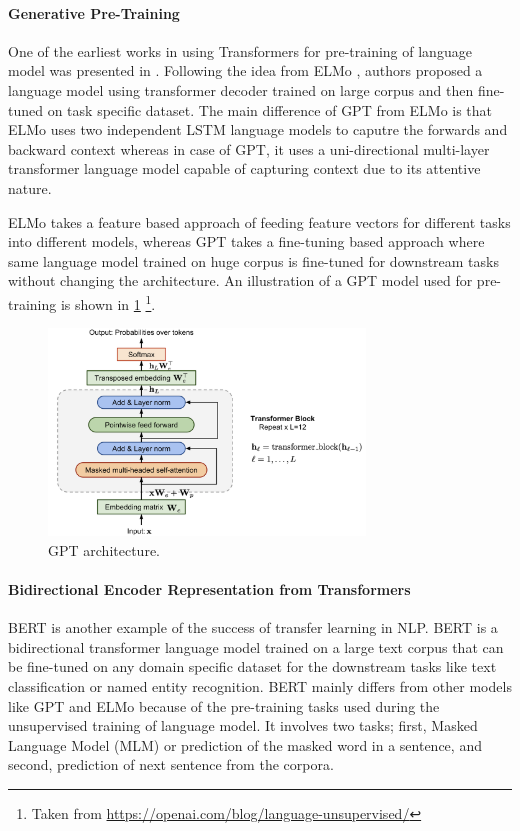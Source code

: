 \paragraph{Generative Pre-Training}
One of the earliest works in using Transformers for pre-training of language model was presented in \cite{radford2018improving}. Following the idea from ELMo \cite{peters2018deep}, authors proposed a language model using transformer decoder trained on large corpus and then fine-tuned on task specific dataset. The main difference of GPT from ELMo is that ELMo uses two independent LSTM language models to caputre the forwards and backward context whereas in case of GPT, it uses a uni-directional multi-layer transformer language model capable of capturing context due to its attentive nature.

ELMo takes a feature based approach of feeding feature vectors for different tasks into different models, whereas GPT takes a fine-tuning based approach where same language model trained on huge corpus is fine-tuned for downstream tasks without changing the architecture. An illustration of a GPT model used for pre-training is shown in \cref{fig:gpt} \footnote{Taken from \url{https://openai.com/blog/language-unsupervised/}}.

\begin{figure}
    \centering
    \includegraphics[width=0.75\textwidth]{images/GPT.png}
    \caption{GPT architecture.}
    \label{fig:gpt}
\end{figure}

\paragraph{Bidirectional Encoder Representation from Transformers}
BERT \cite{devlin2018bert} is another example of the success of transfer learning in NLP. BERT is a bidirectional transformer language model trained on a large text corpus that can be fine-tuned on any domain specific dataset for the downstream tasks like text classification or named entity recognition. BERT mainly differs from other models like GPT and ELMo because of the pre-training tasks used during the unsupervised training of language model. It involves two tasks; first, Masked Language Model (MLM) \cite{taylor1953cloze} or prediction of the masked word in a sentence, and second, prediction of next sentence from the corpora.

